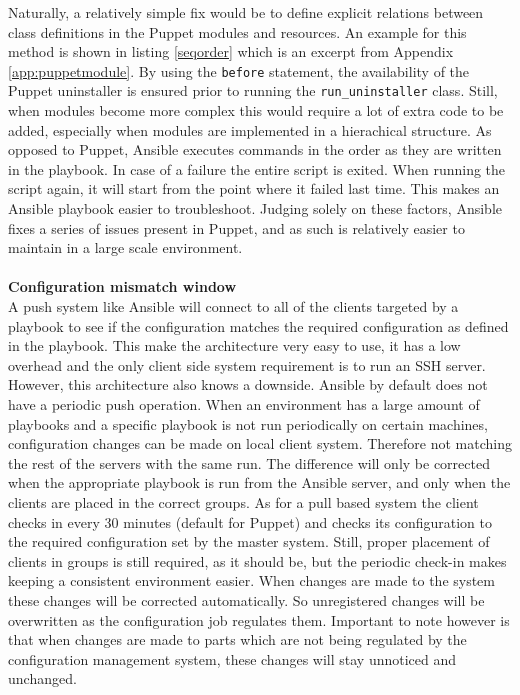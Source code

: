 \noindent
Naturally, a relatively simple fix would be to define explicit relations between class definitions in the Puppet modules and resources. An example for this method is shown in listing \ref{seqorder} which is an excerpt from Appendix \ref{app:puppetmodule}. By using the \texttt{before} statement, the availability of the Puppet uninstaller is ensured prior to running the \texttt{run\_uninstaller} class. Still, when modules become more complex this would require a lot of extra code to be added, especially when modules are implemented in a hierachical structure. As opposed to Puppet, Ansible executes commands in the order as they are written in the playbook. In case of a failure the entire script is exited. When running the script again, it will start from the point where it failed last time. This makes an Ansible playbook easier to troubleshoot. Judging solely on these factors, Ansible fixes a series of issues present in Puppet, and as such is relatively easier to maintain in a large scale environment.
\\\\
\noindent
\textbf{Configuration mismatch window}\\
A push system like Ansible will connect to all of the clients targeted by a playbook to see if the configuration matches the required configuration as defined in the playbook. This make the architecture very easy to use, it has a low overhead and the only client side system requirement is to run an SSH server. However, this architecture also knows a downside. Ansible by default does not have a periodic push operation. When an environment has a large amount of playbooks and a specific playbook is not run periodically on certain machines, configuration changes can be made on local client system. Therefore not matching the rest of the servers with the same run. The difference will only be corrected when the appropriate playbook is run from the Ansible server, and only when the clients are placed in the correct groups. As for a pull based system the client checks in every 30 minutes (default for Puppet) and checks its configuration to the required configuration set by the master system. Still, proper placement of clients in groups is still required, as it should be, but the periodic check-in makes keeping a consistent environment easier. When changes are made to the system these changes will be corrected automatically. So unregistered changes will be overwritten as the configuration job regulates them. Important to note however is that when changes are made to parts which are not being regulated by the configuration management system, these changes will stay unnoticed and unchanged.

